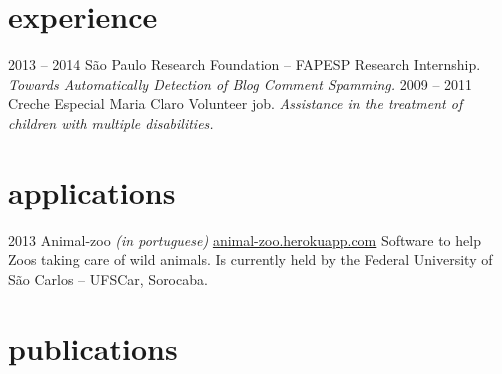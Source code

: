 \documentclass[]{friggeri-cv}
\begin{document}
\section{experience}

\begin{entrylist}
  \entry
    {2013 – 2014}
    {São Paulo Research Foundation – FAPESP}
    {Research Internship.}
    {\emph{Towards Automatically Detection of Blog Comment Spamming.}}
  \entry
    {2009 – 2011}
    {Creche Especial Maria Claro}
    {Volunteer job.}
    {\emph{Assistance in the treatment of children with multiple disabilities.}}
\end{entrylist}

\section{applications}

\begin{entrylist}
  \entry
    {2013}
    {Animal-zoo \emph{(in portuguese)}}
    {\href{http://animal-zoo.herokuapp.com}{animal-zoo.herokuapp.com}}
    {Software to help Zoos taking care of wild animals. Is currently held by the Federal University of São Carlos -- UFSCar, Sorocaba.}
\end{entrylist}

\section{publications}


\begin{refsection}
  \nocite{*}
  \printbibliography[sorting=chronological, type=inproceedings, title={international conferences/proceedings}, notkeyword={brazil}, heading=subbibliography]
\end{refsection}
\begin{refsection}
  \nocite{*}
  \printbibliography[sorting=chronological, type=inproceedings, title={local conferences/proceedings}, keyword={brazil}, heading=subbibliography]
\end{refsection}
\end{document}
